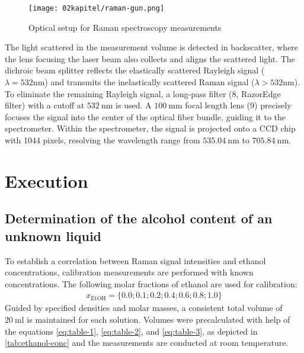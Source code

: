 \begin{figure}[!htb]
    \centering
    \texttt{[image: 02kapitel/raman-gun.png]}
    \caption[Optical setup for Raman spectroscopy measurements]{Optical setup for Raman spectroscopy measurements \autocite{brauerApplicationRamanSpectroscopy2022}}
    \label{fig:raman-gun}
\end{figure}

The light scattered in the measurement volume is detected in backscatter, where the lens focusing the laser beam also collects and aligns the scattered light. The dichroic beam splitter reflects the elastically scattered Rayleigh signal ($\lambda = 532 \mathrm{nm}$) and transmits the inelastically scattered Raman signal ($\lambda > 532 \mathrm{nm}$). To eliminate the remaining Rayleigh signal, a long-pass filter (8, RazorEdge\textsuperscript{\textcopyright} filter) with a cutoff at $532~\mathrm{nm}$ is used. A $100~\mathrm{mm}$ focal length lens (9) precisely focuses the signal into the center of the optical fiber bundle, guiding it to the spectrometer. Within the spectrometer, the signal is projected onto a CCD chip with 1044 pixels, resolving the wavelength range from $535.04~\mathrm{nm}$ to $705.84~\mathrm{nm}$.

\section{Execution}

\subsection{Determination of the alcohol content of an unknown liquid}

To establish a correlation between Raman signal intensities and ethanol concentrations, calibration measurements are performed with known concentrations. The following molar fractions of ethanol are used for calibration:
\begin{align}
    x_\mathrm{EtOH}=\{0.0; 0.1; 0.2; 0.4; 0.6; 0.8; 1.0\} \nonumber
\end{align}
Guided by specified densities and molar masses, a consistent total volume of $20~\mathrm{ml}$ is maintained for each solution. Volumes were precalculated with help of the equations \ref{eq:table-1}, \ref{eq:table-2}, and \ref{eq:table-3}, as depicted in \autoref{tab:ethanol-conc} and the measurements are conducted at room temperature.

